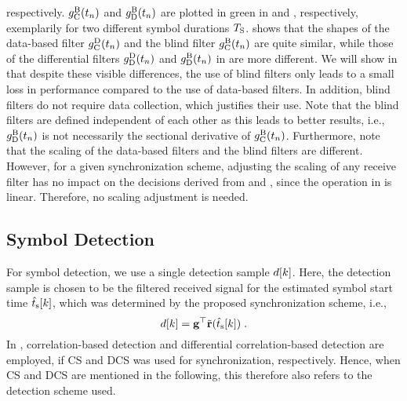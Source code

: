 respectively. $g^{\mathrm{B}}_{\mathrm{C}}(t_n)$ and $g^{\mathrm{B}}_{\mathrm{D}}(t_n)$ are plotted in green in  and , respectively, exemplarily for two different symbol durations $T_{\mathrm{S}}$.  shows that the shapes of the data-based filter $g^{\mathrm{D}}_{\mathrm{C}}(t_n)$ and the blind filter $g^{\mathrm{B}}_{\mathrm{C}}(t_n)$ are quite similar, while those of the differential filters $g^{\mathrm{D}}_{\mathrm{D}}(t_n)$ and $g^{\mathrm{B}}_{\mathrm{D}}(t_n)$ in  are more different. We will show in  that despite these visible differences, the use of blind filters only leads to a small loss in performance compared to the use of data-based filters. In addition, blind filters do not require data collection, which justifies their use. Note that the blind filters are defined independent of each other as this leads to better results, i.e., $g^{\mathrm{B}}_{\mathrm{D}}(t_n)$ is not necessarily the sectional derivative of $g^{\mathrm{B}}_{\mathrm{C}}(t_n)$. Furthermore, note that the scaling of the data-based filters and the blind filters are different. However, for a given synchronization scheme, adjusting the scaling of any receive filter has no impact on the decisions derived from  and , since the operation in  is linear. Therefore, no scaling adjustment is needed.
%
\scaleSubsection
\subsection{Symbol Detection}\label{subsec:symbol_detection}
\scaleSubsectionBelow
%
For symbol detection, we use a single detection sample $d[k]$. Here, the detection sample is chosen to be the filtered received signal for the estimated symbol start time $\hat{t}_\mathrm{s}[k]$, which was determined by the proposed synchronization scheme, i.e., 
\begin{equation}
d[k]=\mathbf{g}^\top \Tilde{\mathbf{r}} (\hat{t}_\mathrm{s}[k]) \;. \label{eq:detection_sample}
\end{equation}
In , correlation-based detection and differential correlation-based detection are employed, if \ac{CS} and \ac{DCS} was used for synchronization, respectively. Hence, when \ac{CS} and \ac{DCS} are mentioned in the following, this therefore also refers to the detection scheme used.


